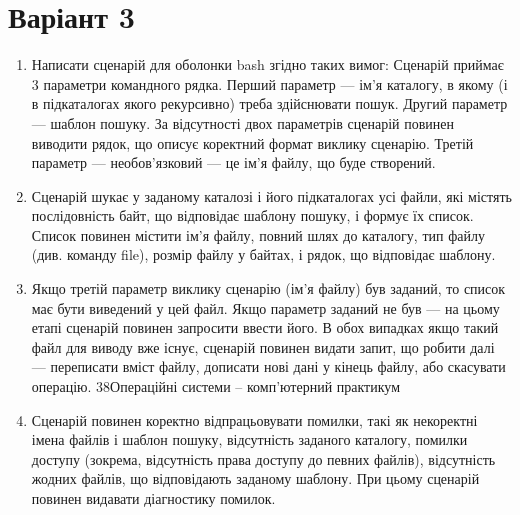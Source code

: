 \documentclass{article}
\begin{document}
 	
 	\newpage
 	
 	\section*{Варіант 3}
 	\begin{enumerate} 
\item Написати сценарій для оболонки bash згідно таких вимог:
 	Сценарій приймає 3 параметри командного рядка. Перший параметр —
 	ім’я каталогу, в якому (і в підкаталогах якого рекурсивно) треба
 	здійснювати пошук. Другий параметр — шаблон пошуку. За
 	відсутності двох параметрів сценарій повинен виводити рядок, що
 	описує коректний формат виклику сценарію. Третій параметр —
 	необов’язковий — це ім’я файлу, що буде створений.
 	\item Сценарій шукає у заданому каталозі і його підкаталогах усі файли, які
 	містять послідовність байт, що відповідає шаблону пошуку, і формує їх
 	список. Список повинен містити ім’я файлу, повний шлях до каталогу,
 	тип файлу (див. команду file), розмір файлу у байтах, і рядок, що
 	відповідає шаблону.
 	\item Якщо третій параметр виклику сценарію (ім’я файлу) був заданий, то
 	список має бути виведений у цей файл. Якщо параметр заданий не
 	був — на цьому етапі сценарій повинен запросити ввести його. В обох
 	випадках якщо такий файл для виводу вже існує, сценарій повинен
 	видати запит, що робити далі — переписати вміст файлу, дописати нові
 	дані у кінець файлу, або скасувати операцію.
 	38Операційні системи – комп’ютерний практикум
 	\item Сценарій повинен коректно відпрацьовувати помилки, такі як
 	некоректні імена файлів і шаблон пошуку, відсутність заданого
 	каталогу, помилки доступу (зокрема, відсутність права доступу до
 	певних файлів), відсутність жодних файлів, що відповідають заданому
 	шаблону. При цьому сценарій повинен видавати діагностику помилок.
 \end{enumerate}
\end{document}
